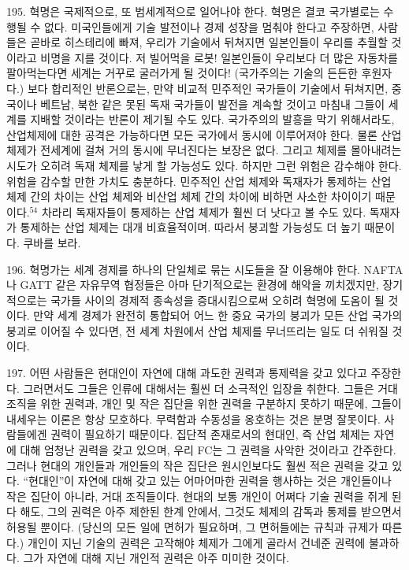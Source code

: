 \documentclass[11pt,a4paper]{article}
\begin{document}
\begin{multicols}{2}
195. 혁명은 국제적으로, 또 범세계적으로 일어나야 한다. 혁명은 결코 국가별로는 수행될 수 없다.  미국인들에게 기술 발전이나 경제 성장을 멈춰야 한다고 주장하면, 사람들은 곧바로 히스테리에 빠져,  우리가 기술에서 뒤쳐지면 일본인들이 우리를 추월할 것이라고 비명을 지를 것이다. 저 빌어먹을 로봇! 일본인들이 우리보다 더 많은 자동차를 팔아먹는다면 세계는 거꾸로 굴러가게 될 것이다! (국가주의는  기술의 든든한 후원자다.) 보다 합리적인 반론으로는, 만약 비교적 민주적인 국가들이 기술에서  뒤쳐지면, 중국이나 베트남, 북한 같은 못된 독재 국가들이 발전을 계속할 것이고 마침내 그들이 세계를  지배할 것이라는 반론이 제기될 수도 있다. 국가주의의 발흥을 막기 위해서라도, 산업체제에 대한 공격은  가능하다면 모든 국가에서 동시에 이루어져야 한다. 물론 산업 체제가 전세계에 걸쳐 거의 동시에  무너진다는 보장은 없다. 그리고 체제를 몰아내려는 시도가 오히려 독재 체제를 낳게 할 가능성도 있다.  하지만 그런 위험은 감수해야 한다. 위험을 감수할 만한 가치도 충분하다. 민주적인 산업 체제와 독재자가 통제하는 산업 체제 간의 차이는 산업 체제와 비산업 체제 간의 차이에 비하면 사소한 차이이기 때문이다.\hyperlink{54}{$^{54}$} 차라리 독재자들이 통제하는 산업 체제가 훨씬 더 낫다고 볼 수도 있다. 독재자가 통제하는 산업 체제는 대개 비효율적이며. 따라서 붕괴할 가능성도 더 높기 때문이다. 쿠바를 보라. 


196. 혁명가는 세계 경제를 하나의 단일체로 묶는 시도들을 잘 이용해야 한다. NAFTA나 GATT 같은  자유무역 협정들은 아마 단기적으로는 환경에 해악을 끼치겠지만, 장기적으로는 국가들 사이의 경제적  종속성을 증대시킴으로써 오히려 혁명에 도옴이 될 것이다. 만약 세계 경제가 완전히 통합되어 어느 한  중요 국가의 붕괴가 모든 산업 국가의 붕괴로 이어질 수 있다면, 전 세계 차원에서 산업 체제를  무너뜨리는 일도 더 쉬워질 것이다. 


197. 어떤 사람들은 현대인이 자연에 대해 과도한 권력과 통제력을 갖고 있다고 주장한다. 그러면서도  그들은 인류에 대해서는 훨씬 더 소극적인 입장을 취한다. 그들은 거대 조직을 위한 권력과, 개인 및 작은  집단을 위한 권력을 구분하지 못하기 때문에, 그들이 내세우는 이론은 항상 모호하다. 무력함과 수동성을  옹호하는 것은 분명 잘못이다. 사람들에겐 권력이 필요하기 때문이다. 집단적 존재로서의 현대인, 즉 산업 체제는 자연에 대해 엄청난 권력을 갖고 있으며, 우리 FC는 그 권력을 사악한 것이라고 간주한다. 그러나  현대의 개인들과 개인들의 작은 집단은 원시인보다도 훨씬 적은 권력을 갖고 있다. “현대인”이 자연에  대해 갖고 있는 어마어마한 권력을 행사하는 것은 개인들이나 작은 집단이 아니라, 거대 조직들이다.  현대의 보통 개인이 어쩌다 기술 권력을 쥐게 된다 해도, 그의 권력은 아주 제한된 한계 안에서, 그것도  체제의 감독과 통제를 받으면서 허용될 뿐이다. (당신의 모든 일에 면허가 필요하며, 그 면허들에는  규칙과 규제가 따른다.) 개인이 지닌 기술의 권력은 고작해야 체제가 그에게 골라서 건네준 권력에  불과하다. 그가 자연에 대해 지닌 개인적 권력은 아주 미미한 것이다.  



\end{multicols}
\end{document}
